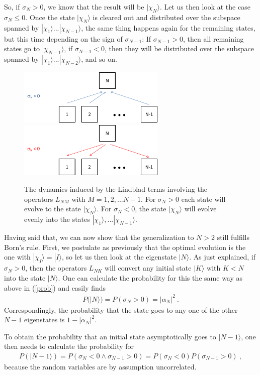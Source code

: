 \documentclass[12pt]{article}
\def\beqn{\begin{eqnarray}}
\def\eeqn{\end{eqnarray}}
\begin{document}
So, if $\sigma_N>0$, we know that the result will be $|\chi_N\rangle$. Let us then look at the case $\sigma_N \leq 0.$ Once the state $|\chi_N\rangle$ is cleared out and distributed over the subspace spanned by $|\chi_1\rangle ... |\chi_{N-1}\rangle$, the same thing happens again for the remaining states, but this time depending on the sign of $\sigma_{N-1}$: If $\sigma_{N-1} >0$, then all remaining states go to $|\chi_{N-1}\rangle$, if $\sigma_{N-1} < 0$, then they will be distributed over the subspace spanned by $|\chi_1\rangle ... |\chi_{N-2}\rangle$, and so on. 

\begin{figure}[h]
\centering
\includegraphics[width=7cm]{sigma_pos.png}
\includegraphics[width=7cm]{sigma_neg.png}
\caption{The dynamics induced by the Lindblad terms involving the operators $L_{NM}$ with $M=1,2,...N-1$. For $\sigma_N>0$  each state will evolve to the state $|\chi_N\rangle$. For $\sigma_N<0$, the state $|\chi_N\rangle$ will evolve evenly into the states $|\chi_1\rangle,...|\chi_{N-1}\rangle$. \protect{\label{sigma}}}
 
\end{figure}

Having said that, we can now show that the generalization to $N>2$ still fulfills Born's rule. First, we postulate as previously that the optimal evolution is the one with $|\chi_I \rangle = |I \rangle$, so let us then look at the eigenstate $|N\rangle$. As just explained, if $\sigma_{N} > 0$, then the operators $L_{NK}$ will convert any initial state $|K\rangle$ with $K<N$ into the state $|N\rangle$. One can calculate the probability for this the same way as above in (\ref{prob}) and easily finds
\beqn
P(|N\rangle) = P(\sigma_N > 0) = |\alpha_N|^2~.
\eeqn
Correspondingly, the probability that the state goes to any one of the other $N-1$ eigenstates is $1-|\alpha_{N}|^2$. 

To obtain the probability that an initial state asymptotically goes to $|N-1\rangle$, one then needs to calculate the probability for
\beqn
P(|N -1\rangle) = P(\sigma_N < 0 \wedge \sigma_{N-1} > 0) = P(\sigma_N < 0) P(\sigma_{N-1} > 0)~,
\eeqn
because the random variables are by assumption uncorrelated. 
\end{document}
